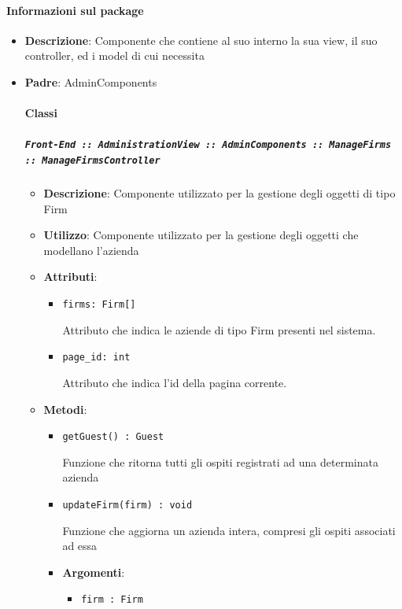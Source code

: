 \documentclass[../DefinizioneDiProdotto.tex]{subfiles}
\begin{document}
	\paragraph{Informazioni sul package}\begin{itemize}\item \textbf{Descrizione}: Componente che contiene al suo interno la sua view, il suo controller, ed i model di cui necessita\item \textbf{Padre}: AdminComponents\paragraph{Classi}
	\subparagraph{\texttt{Front-End :: AdministrationView :: AdminComponents :: ManageFirms :: ManageFirmsController}}
	\begin{itemize}\item \textbf{Descrizione}: Componente utilizzato per la gestione degli oggetti di tipo Firm
	\item \textbf{Utilizzo}: Componente utilizzato per la gestione degli oggetti che modellano l'azienda
	\item \textbf{Attributi}:
	\begin{itemize}
	\item \texttt{firms: Firm[]}\

	 Attributo che indica le aziende di tipo Firm presenti nel sistema.
	\end{itemize}
	\begin{itemize}
	\item \texttt{page\_id: int}\

	 Attributo che indica l'id della pagina corrente.
	\end{itemize}
	\item \textbf{Metodi}:
	\begin{itemize}
	\item \texttt{getGuest() : Guest}\

	 Funzione che ritorna tutti gli ospiti registrati ad una determinata azienda
	\end{itemize}\vspace{0.5em}
	\begin{itemize}
	\item \texttt{updateFirm(firm) : void}\

	 Funzione che aggiorna un azienda intera, compresi gli ospiti associati ad essa

	\item \textbf{Argomenti}:
	\begin{itemize}
	\item \texttt{firm : Firm}\


\end{itemize}
\end{itemize}
\end{itemize}
\end{itemize}
\end{document}
